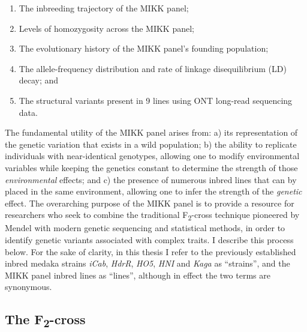 \documentclass[
]{book}
\begin{document}
\begin{enumerate}
\def\labelenumi{\arabic{enumi}.}
\item
  The inbreeding trajectory of the MIKK panel;
\item
  Levels of homozygosity across the MIKK panel;
\item
  The evolutionary history of the MIKK panel's founding population;
\item
  The allele-frequency distribution and rate of linkage disequilibrium (LD) decay; and
\item
  The structural variants present in 9 lines using ONT long-read sequencing data.
\end{enumerate}

The fundamental utility of the MIKK panel arises from: a) its representation of the genetic variation that exists in a wild population; b) the ability to replicate individuals with near-identical genotypes, allowing one to modify environmental variables while keeping the genetics constant to determine the strength of those \emph{environmental} effects; and c) the presence of numerous inbred lines that can by placed in the same environment, allowing one to infer the strength of the \emph{genetic} effect. The overarching purpose of the MIKK panel is to provide a resource for researchers who seek to combine the traditional F\textsubscript{2}-cross technique pioneered by Mendel with modern genetic sequencing and statistical methods, in order to identify genetic variants associated with complex traits. I describe this process below. For the sake of clarity, in this thesis I refer to the previously established inbred medaka strains \emph{iCab}, \emph{HdrR}, \emph{HO5}, \emph{HNI} and \emph{Kaga} as ``strains'', and the MIKK panel inbred lines as ``lines'', although in effect the two terms are synonymous.

\hypertarget{the-f2-cross}{%
\subsection{\texorpdfstring{The F\textsubscript{2}-cross}{The F2-cross}}\label{the-f2-cross}}
\end{document}
